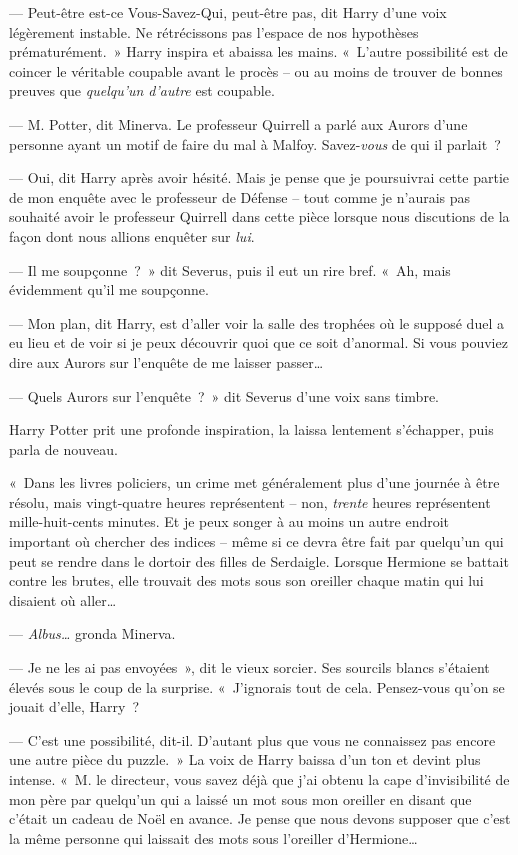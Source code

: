 --- Peut-être est-ce Vous-Savez-Qui, peut-être pas, dit Harry d'une voix légèrement instable. Ne rétrécissons pas l'espace de nos hypothèses prématurément.~» Harry inspira et abaissa les mains. «~L'autre possibilité est de coincer le véritable coupable avant le procès -- ou au moins de trouver de bonnes preuves que \emph{quelqu'un d'autre} est coupable.

--- M. Potter, dit Minerva. Le professeur Quirrell a parlé aux Aurors d'une personne ayant un motif de faire du mal à Malfoy. Savez-\emph{vous} de qui il parlait~?

--- Oui, dit Harry après avoir hésité. Mais je pense que je poursuivrai cette partie de mon enquête avec le professeur de Défense -- tout comme je n'aurais pas souhaité avoir le professeur Quirrell dans cette pièce lorsque nous discutions de la façon dont nous allions enquêter sur \emph{lui}.

--- Il me soupçonne~?~» dit Severus, puis il eut un rire bref. «~Ah, mais évidemment qu'il me soupçonne.

--- Mon plan, dit Harry, est d'aller voir la salle des trophées où le supposé duel a eu lieu et de voir si je peux découvrir quoi que ce soit d'anormal. Si vous pouviez dire aux Aurors sur l'enquête de me laisser passer…

--- Quels Aurors sur l'enquête~?~» dit Severus d'une voix sans timbre.

Harry Potter prit une profonde inspiration, la laissa lentement s'échapper, puis parla de nouveau.

«~Dans les livres policiers, un crime met généralement plus d'une journée à être résolu, mais vingt-quatre heures représentent -- non, \emph{trente} heures représentent mille-huit-cents minutes. Et je peux songer à au moins un autre endroit important où chercher des indices -- même si ce devra être fait par quelqu'un qui peut se rendre dans le dortoir des filles de Serdaigle. Lorsque Hermione se battait contre les brutes, elle trouvait des mots sous son oreiller chaque matin qui lui disaient où aller…

--- \emph{Albus…} gronda Minerva.

--- Je ne les ai pas envoyées~», dit le vieux sorcier. Ses sourcils blancs s'étaient élevés sous le coup de la surprise. «~J'ignorais tout de cela. Pensez-vous qu'on se jouait d'elle, Harry~?

--- C'est une possibilité, dit-il. D'autant plus que vous ne connaissez pas encore une autre pièce du puzzle.~» La voix de Harry baissa d'un ton et devint plus intense. «~M. le directeur, vous savez déjà que j'ai obtenu la cape d'invisibilité de mon père par quelqu'un qui a laissé un mot sous mon oreiller en disant que c'était un cadeau de Noël en avance. Je pense que nous devons supposer que c'est la même personne qui laissait des mots sous l'oreiller d'Hermione…

